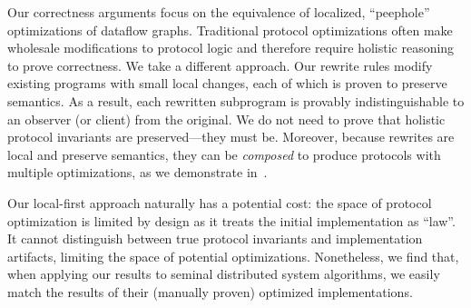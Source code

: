Our correctness arguments focus on the equivalence of localized,
``peephole'' optimizations of dataflow graphs.
Traditional protocol optimizations often make wholesale modifications to protocol logic and therefore require holistic reasoning to prove correctness.
We take a different approach. Our rewrite rules modify existing programs with small local changes, each of which is proven to preserve semantics. 
As a result, each rewritten subprogram is provably indistinguishable to an observer (or client) from the original.
We do not need to prove that holistic protocol invariants are preserved---they must be.
Moreover, because rewrites are local and preserve semantics, they can be \emph{composed} to produce protocols with multiple optimizations, as we demonstrate in~.

Our local-first approach naturally has a potential cost: the space of protocol optimization is limited by design as it treats the initial implementation as ``law''.
It cannot distinguish between true protocol invariants and implementation artifacts, limiting the space of potential optimizations. Nonetheless, we find that, when applying our results to seminal distributed system algorithms, we easily match the results of their (manually proven) optimized implementations.

